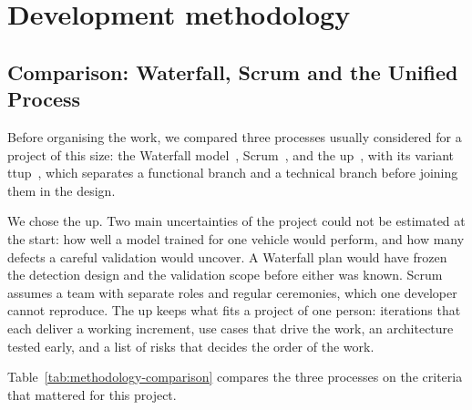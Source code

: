 \section{Development methodology}
\label{sec:methodology}

\subsection{Comparison: Waterfall, Scrum and the Unified Process}

Before organising the work, we compared three processes usually considered for a project of this size: the Waterfall model~\cite{royce1970managing}, Scrum~\cite{schwaber2020scrum}, and the \gls{up}~\cite{jacobson1999unified}, with its variant \gls{ttup}~\cite{roques2007uml}, which separates a functional branch and a technical branch before joining them in the design.

We chose the \gls{up}. Two main uncertainties of the project could not be estimated at the start: how well a model trained for one vehicle would perform, and how many defects a careful validation would uncover. A Waterfall plan would have frozen the detection design and the validation scope before either was known. Scrum assumes a team with separate roles and regular ceremonies, which one developer cannot reproduce. The \gls{up} keeps what fits a project of one person: iterations that each deliver a working increment, use cases that drive the work, an architecture tested early, and a list of risks that decides the order of the work.

Table~\ref{tab:methodology-comparison} compares the three processes on the criteria that mattered for this project.

